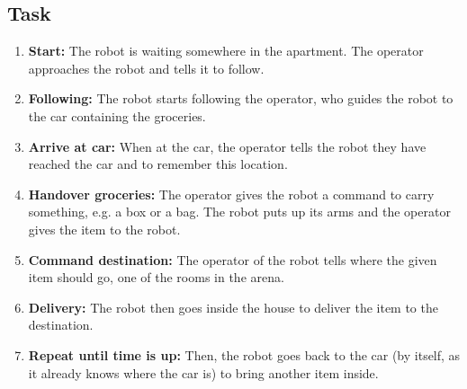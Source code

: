 \subsection{Task}
\begin{enumerate}
\item \textbf{Start:} The robot is waiting somewhere in the apartment. The operator approaches the robot and tells it to follow.
\item \textbf{Following:} The robot starts following the operator, who guides the robot to the car containing the groceries. 
\item \textbf{Arrive at car:} When at the car, the operator tells the robot they have reached the car and to remember this location.
\item \textbf{Handover groceries:} The operator gives the robot a command to carry something, e.g. a box or a bag.  
  The robot puts up its arms and the operator gives the item to the robot.
\item \textbf{Command destination:} The operator of the robot tells where the given item should go, one of the rooms in the arena. 
\item \textbf{Delivery:} The robot then goes inside the house to deliver the item to the destination. 
\item \textbf{Repeat until time is up:} Then, the robot goes back to the car (by itself, as it already knows where the car is) to bring another item inside. 
\end{enumerate}

